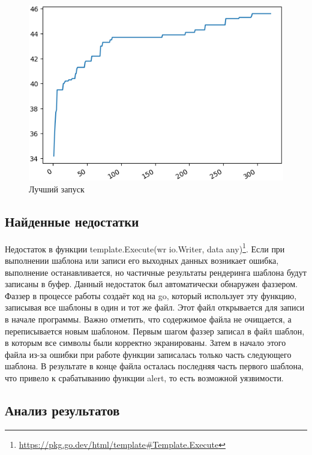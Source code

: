 \documentclass[a4paper]{article}
\begin{document}
\begin{figure}[ht!]
    \includegraphics[width=170mm]{BestRun.png}
    \caption{Лучший запуск}
    \label{BestRun}
    \end{figure}

\subsection{Найденные недостатки}

Недостаток в функции template.Execute(wr io.Writer, data any)\footnote{\href{https://pkg.go.dev/html/template\#Template.Execute}{https://pkg.go.dev/html/template\#Template.Execute}}. Если при выполнении шаблона или записи его выходных данных возникает ошибка, выполнение останавливается, но частичные результаты рендеринга шаблона будут записаны в буфер. Данный недостаток был автоматически обнаружен фаззером. Фаззер в процессе работы создаёт код на go, который использует эту функцию, записывая все шаблоны в один и тот же файл. Этот файл открывается для записи в начале программы. Важно отметить, что содержимое файла не очищается, а  переписывается новым шаблоном. Первым шагом фаззер записал в файл шаблон, в которым все символы были корректно экранированы. Затем в начало этого файла из-за ошибки при работе функции записалась только часть следующего шаблона. В результате в конце файла осталась последняя часть первого шаблона, что привело к срабатыванию функции alert, то есть возможной уязвимости. 

\subsection{Анализ результатов}
\end{document}

